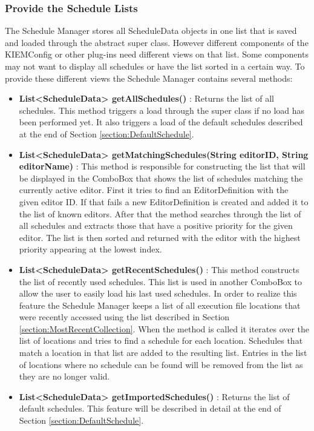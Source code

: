 \subsubsection{Provide the Schedule Lists}
\label{section:ProvideScheduleLists}
The Schedule Manager stores all ScheduleData objects in one list that is saved and loaded through
the abstract super class. However different components of the \ac{KIEMConfig} or other plug-ins 
need different views on that list. Some components may not want to display all schedules or have
the list sorted in a certain way. To provide these different views the Schedule Manager contains
several methods:
\begin{itemize}
 \item \textbf{List<ScheduleData> getAllSchedules()} : Returns the list of all schedules. This
method triggers a load through the super class if no load has been performed yet. It also triggers
a load of the default schedules described at the end of Section \ref{section:DefaultSchedule}.
 \item \textbf{List<ScheduleData> getMatchingSchedules(String editorID, String editorName)} :
This method is responsible for constructing the list that will be displayed in the ComboBox that
shows the list of schedules matching the currently active editor. First it tries to find an
EditorDefinition with the given editor ID. If that fails a new EditorDefinition is created and
added it to the list of known editors. After that the method searches through the list of
all schedules and extracts those that have a positive priority for the given editor. The list
is then sorted  and returned with the editor with the highest priority appearing at the lowest index.
 \item \textbf{List<ScheduleData> getRecentSchedules()} : This method constructs the list of 
recently used schedules. This list is used in another ComboBox to allow the user to easily load
his last used schedules. In order to realize this feature the Schedule Manager keeps a list of
all execution file locations that were recently accessed using the list described in Section
\ref{section:MostRecentCollection}. When the method is called it iterates over the list of locations
and tries to find a schedule for each location. Schedules that match a location in that list are 
added to the resulting list. Entries in the list of locations where no schedule can be found will
be removed from the list as they are no longer valid.
 \item \textbf{List<ScheduleData> getImportedSchedules()} : Returns the list of default schedules.
This feature will be described in detail at the end of Section \ref{section:DefaultSchedule}.
\end{itemize}


